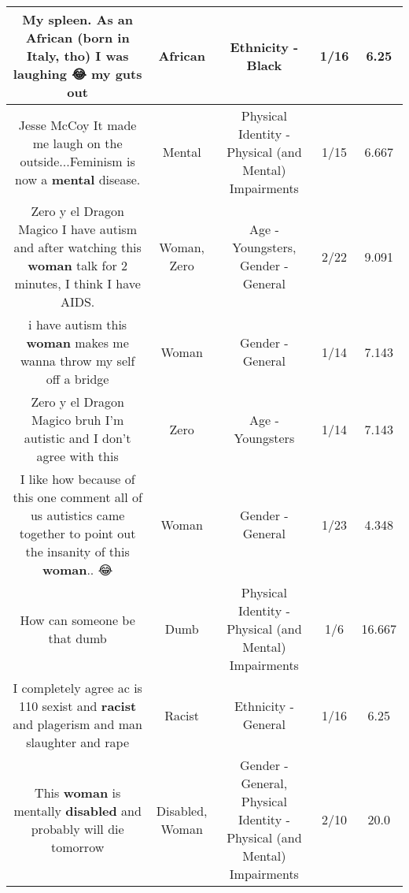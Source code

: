 \documentclass[11pt]{article}
\newlength\mylength
\begin{document}
\begin{center}
\begin{longtable}{|C{.65\mylength}|C{.30\mylength}|C{.12\mylength}|C{.12\mylength}|C{.12\mylength}|}
  \small My spleen. As an \textbf{African} (born in Italy, tho) I was laughing 😂 my guts out\normalsize   & African & Ethnicity - Black & 1/16 & 6.25 \\  \hline
  \small Jesse McCoy It made me laugh on the outside...Feminism is now a \textbf{mental} disease.\normalsize   & Mental & Physical Identity - Physical (and Mental) Impairments & 1/15 & 6.667 \\  \hline
  \small Zero y el Dragon Magico I have autism and after watching this \textbf{woman} talk for 2 minutes, I think I have AIDS.\normalsize   & Woman, Zero & Age - Youngsters, Gender - General & 2/22 & 9.091 \\  \hline
  \small i have autism this \textbf{woman} makes me wanna throw my self off a bridge\normalsize   & Woman & Gender - General & 1/14 & 7.143 \\  \hline
  \small Zero y el Dragon Magico bruh I'm autistic and I don't agree with this\normalsize   & Zero & Age - Youngsters & 1/14 & 7.143 \\  \hline
  \small I like how because of this one comment all of us autistics came together to point out the insanity of this \textbf{woman}.. 😂\normalsize   & Woman & Gender - General & 1/23 & 4.348 \\  \hline
  \small How can someone be that dumb\normalsize   & Dumb & Physical Identity - Physical (and Mental) Impairments & 1/6 & 16.667 \\  \hline
  \small I completely agree ac is 110 sexist and \textbf{racist} and plagerism and man slaughter and rape\normalsize   & Racist & Ethnicity - General & 1/16 & 6.25 \\  \hline
  \small This \textbf{woman} is mentally \textbf{disabled} and probably will die tomorrow\normalsize   & Disabled, Woman & Gender - General, Physical Identity - Physical (and Mental) Impairments & 2/10 & 20.0 \\  \hline

\end{longtable}
\end{center}
\end{document}
